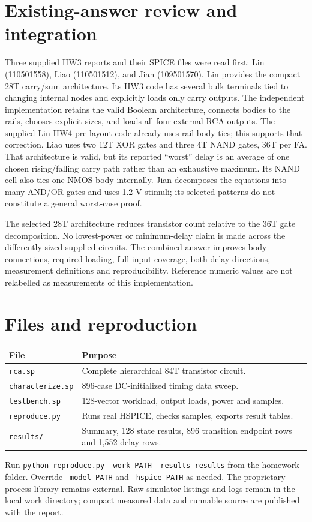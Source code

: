 \documentclass[11pt,a4paper]{article}
\begin{document}
\section*{Existing-answer review and integration}
Three supplied HW3 reports and their SPICE files were read first:
Lin (110501558), Liao (110501512), and Jian (109501570).
Lin provides the compact 28T carry/sum architecture. Its HW3 code has
several bulk terminals tied to changing internal nodes and explicitly loads
only carry outputs. The independent implementation retains the valid
Boolean architecture, connects bodies to the rails, chooses explicit sizes,
and loads all four external RCA outputs. The supplied Lin HW4 pre-layout
code already uses rail-body ties; this supports that correction.
Liao uses two 12T XOR gates and three 4T NAND gates, 36T per FA. That
architecture is valid, but its reported ``worst'' delay is an average of
one chosen rising/falling carry path rather than an exhaustive maximum.
Its NAND cell also ties one NMOS body internally.
Jian decomposes the equations into many AND/OR gates and uses 1.2 V stimuli;
its selected patterns do not constitute a general worst-case proof.

The selected 28T architecture reduces transistor count relative to the 36T
gate decomposition. No lowest-power or minimum-delay claim is made across
the differently sized supplied circuits. The combined answer improves
body connections, required loading, full input coverage, both delay
directions, measurement definitions and reproducibility. Reference numeric
values are not relabelled as measurements of this implementation.

\section*{Files and reproduction}
\begin{center}\begin{tabular}{p{.37\linewidth}p{.54\linewidth}}
\toprule File&Purpose\\\midrule
\texttt{rca.sp}&Complete hierarchical 84T transistor circuit.\\
\texttt{characterize.sp}&896-case DC-initialized timing data sweep.\\
\texttt{testbench.sp}&128-vector workload, output loads, power and samples.\\
\texttt{reproduce.py}&Runs real HSPICE, checks samples, exports result tables.\\
\texttt{results/}&Summary, 128 state results, 896 transition endpoint rows and 1,552 delay rows.\\\bottomrule
\end{tabular}\end{center}
Run \texttt{python reproduce.py --work PATH --results results} from the
homework folder. Override \texttt{--model PATH} and \texttt{--hspice PATH}
as needed. The proprietary process library remains external. Raw simulator
listings and logs remain in the local work directory; compact measured data
and runnable source are published with the report.
\end{document}
